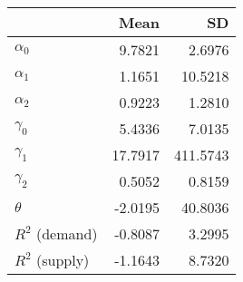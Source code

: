 
\begin{tabular}[t]{lrr}
\toprule
  & Mean & SD\\
\midrule
$\alpha_{0}$ & 9.7821 & 2.6976\\
$\alpha_{1}$ & 1.1651 & 10.5218\\
$\alpha_{2}$ & 0.9223 & 1.2810\\
$\gamma_{0}$ & 5.4336 & 7.0135\\
$\gamma_{1}$ & 17.7917 & 411.5743\\
$\gamma_{2}$ & 0.5052 & 0.8159\\
$\theta$ & -2.0195 & 40.8036\\
$R^{2}$ (demand) & -0.8087 & 3.2995\\
$R^{2}$ (supply) & -1.1643 & 8.7320\\
\bottomrule
\end{tabular}
